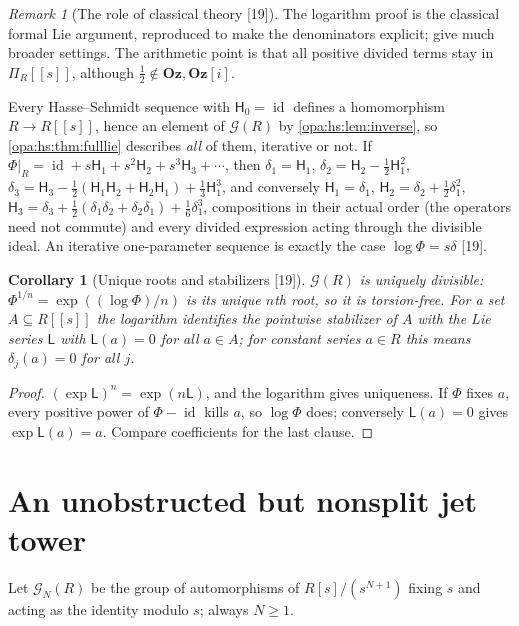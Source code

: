 \documentclass[11pt,oneside]{article}
\numberwithin{equation}{section}
\newtheorem{corollary}[corollary]{Corollary}
\theoremstyle{definition}
\theoremstyle{remark}
\newtheorem{remark}[remark]{Remark}
\newcommand{\Oz}{\mathbf{Oz}}
\newcommand{\Og}{\mathbf{Oz}[i]}
\newcommand{\id}{\operatorname{id}}
\newcommand{\src}[1]{\textup{\textsf{\small[#1]}}}
\begin{document}
\begin{remark}[The role of classical theory \src{19}]\label{opa:hs:rem:classical}
The logarithm proof is the classical formal Lie argument, reproduced to make the denominators explicit; \cite{Hazewinkel,Bagayoko} give much broader
settings. The arithmetic point is that all positive divided terms stay in $\Pi_R[[s]]$, although $\frac12\notin\Oz,\Og$.
\end{remark}

Every Hasse--Schmidt sequence with $\mathsf H_0=\id$ defines a homomorphism $R\to R[[s]]$, hence an element of $\mathcal G(R)$ by
\cref{opa:hs:lem:inverse}, so \cref{opa:hs:thm:fulllie} describes \emph{all} of them, iterative or not. If $\Phi|_R=\id+s\mathsf H_1+s^2\mathsf H_2+s^3\mathsf H_3+\cdots$,
then $\delta_1=\mathsf H_1$, $\delta_2=\mathsf H_2-\frac12\mathsf H_1^2$, $\delta_3=\mathsf H_3-\frac12(\mathsf H_1\mathsf H_2+\mathsf H_2\mathsf H_1)+\frac13\mathsf H_1^3$, and
conversely $\mathsf H_1=\delta_1$, $\mathsf H_2=\delta_2+\frac12\delta_1^2$, $\mathsf H_3=\delta_3+\frac12(\delta_1\delta_2+\delta_2\delta_1)+\frac16\delta_1^3$, compositions
in their actual order (the operators need not commute) and every divided expression acting through the divisible ideal. An iterative one-parameter
sequence is exactly the case $\log\Phi=s\delta$ \src{19}.

\begin{corollary}[Unique roots and stabilizers \src{19}]\label{opa:hs:cor:roots}
$\mathcal G(R)$ is uniquely divisible: $\Phi^{1/n}=\exp((\log\Phi)/n)$ is its unique $n$th root, so it is torsion-free. For a set $A\subseteq R[[s]]$ the
logarithm identifies the pointwise stabilizer of $A$ with the Lie series $\mathsf L$ with $\mathsf L(a)=0$ for all $a\in A$; for constant series $a\in R$ this
means $\delta_j(a)=0$ for all $j$.
\end{corollary}
\begin{proof}
$(\exp\mathsf L)^n=\exp(n\mathsf L)$, and the logarithm gives uniqueness. If $\Phi$ fixes $a$, every positive power of $\Phi-\id$ kills $a$, so $\log\Phi$ does;
conversely $\mathsf L(a)=0$ gives $\exp\mathsf L(a)=a$. Compare coefficients for the last clause.
\end{proof}

\section{An unobstructed but nonsplit jet tower}\label{opa:hs:sec:jets}

Let $\mathcal G_N(R)$ be the group of automorphisms of $R[s]/(s^{N+1})$ fixing $s$ and acting as the identity modulo $s$; always $N\ge1$.
\end{document}

